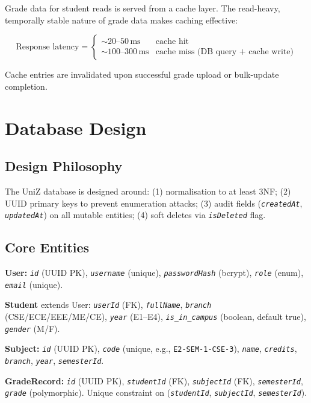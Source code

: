 \documentclass[12pt,a4paper]{report}
\newcommand{\field}[1]{\texttt{\textit{#1}}}
\newcommand{\code}[1]{\texttt{#1}}
\begin{document}
Grade data for student reads is served from a cache layer. The read-heavy, temporally stable nature of grade data makes caching effective:

\begin{equation}
  \text{Response latency} = \begin{cases} \sim 20\text{--}50\,\text{ms} & \text{cache hit} \\ \sim 100\text{--}300\,\text{ms} & \text{cache miss (DB query + cache write)} \end{cases}
\end{equation}

Cache entries are invalidated upon successful grade upload or bulk-update completion.

\chapter{Database Design}

\section{Design Philosophy}

The UniZ database is designed around: (1) normalisation to at least 3NF; (2) UUID primary keys to prevent enumeration attacks; (3) audit fields (\field{createdAt}, \field{updatedAt}) on all mutable entities; (4) soft deletes via \field{isDeleted} flag.

\section{Core Entities}

\textbf{User:} \field{id} (UUID PK), \field{username} (unique), \field{passwordHash} (bcrypt), \field{role} (enum), \field{email} (unique).

\textbf{Student} extends User: \field{userId} (FK), \field{fullName}, \field{branch} (CSE/ECE/EEE/ME/CE), \field{year} (E1--E4), \field{is\_in\_campus} (boolean, default true), \field{gender} (M/F).

\textbf{Subject:} \field{id} (UUID PK), \field{code} (unique, e.g., \code{E2-SEM-1-CSE-3}), \field{name}, \field{credits}, \field{branch}, \field{year}, \field{semesterId}.

\textbf{GradeRecord:} \field{id} (UUID PK), \field{studentId} (FK), \field{subjectId} (FK), \field{semesterId}, \field{grade} (polymorphic). Unique constraint on (\field{studentId}, \field{subjectId}, \field{semesterId}).
\end{document}
